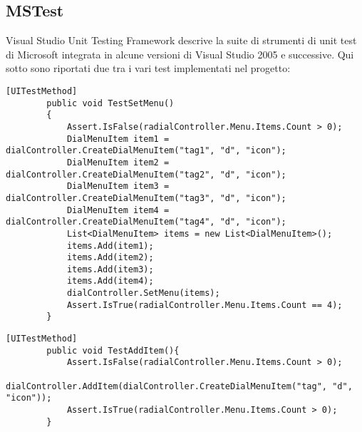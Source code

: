\subsection{MSTest}
Visual Studio Unit Testing Framework descrive la suite di strumenti di unit test di Microsoft integrata in alcune versioni di Visual Studio 2005 e successive.
Qui sotto sono riportati due tra i vari test implementati nel progetto:
 
\vspace{1.0cm}
\begin{lstlisting}[caption={Test SetMenu},style=javaScriptCode]
    [UITestMethod]
        public void TestSetMenu()
        {
            Assert.IsFalse(radialController.Menu.Items.Count > 0);
            DialMenuItem item1 = dialController.CreateDialMenuItem("tag1", "d", "icon");
            DialMenuItem item2 = dialController.CreateDialMenuItem("tag2", "d", "icon");
            DialMenuItem item3 = dialController.CreateDialMenuItem("tag3", "d", "icon");
            DialMenuItem item4 = dialController.CreateDialMenuItem("tag4", "d", "icon");
            List<DialMenuItem> items = new List<DialMenuItem>();
            items.Add(item1);
            items.Add(item2);
            items.Add(item3);
            items.Add(item4);
            dialController.SetMenu(items);
            Assert.IsTrue(radialController.Menu.Items.Count == 4);
        }
\end{lstlisting} 
\vspace{1.0cm}

\vspace{1.0cm}
\begin{lstlisting}[caption={Test aggiunta voce di Menu'},style=javaScriptCode]
  [UITestMethod]
        public void TestAddItem(){
            Assert.IsFalse(radialController.Menu.Items.Count > 0);
            dialController.AddItem(dialController.CreateDialMenuItem("tag", "d", "icon"));
            Assert.IsTrue(radialController.Menu.Items.Count > 0);
        }
\end{lstlisting} 
\vspace{1.0cm}
